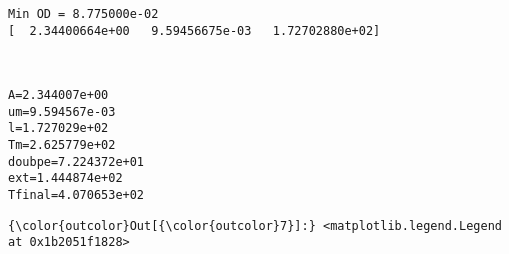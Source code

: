 \documentclass[11pt]{article}
\begin{document}
    \begin{Verbatim}[commandchars=\\\{\}]
Min OD = 8.775000e-02
[  2.34400664e+00   9.59456675e-03   1.72702880e+02]

    \end{Verbatim}

    \begin{center}
    \end{center}
    { \hspace*{\fill} \\}
    
    \begin{Verbatim}[commandchars=\\\{\}]
A=2.344007e+00
um=9.594567e-03
l=1.727029e+02
Tm=2.625779e+02
doubpe=7.224372e+01
ext=1.444874e+02
Tfinal=4.070653e+02

    \end{Verbatim}

            \begin{Verbatim}[commandchars=\\\{\}]
{\color{outcolor}Out[{\color{outcolor}7}]:} <matplotlib.legend.Legend at 0x1b2051f1828>
\end{Verbatim}
        
    \begin{center}
    \end{center}
    { \hspace*{\fill} \\}
    
    \begin{center}
    \end{center}
    { \hspace*{\fill} \\}
    
\end{document}

